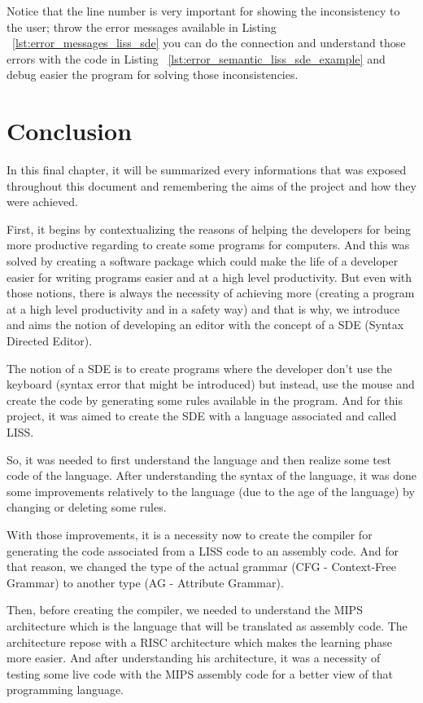\documentclass[
  oneside,
  11pt, a4paper,
  footinclude=true,
  headinclude=true,
  cleardoublepage=empty
]{scrbook}
\begin{document}
Notice that the line number is very important for showing the inconsistency to the user; throw the error messages available in Listing ~\ref{lst:error_messages_liss_sde} you can do the connection and understand those errors with the code in Listing ~\ref{lst:error_semantic_liss_sde_example} and debug easier the program for solving those inconsistencies.


\chapter{Conclusion}

In this final chapter, it will be summarized every informations that was exposed throughout this document and remembering the aims of the project and how they were achieved.

First, it begins by contextualizing the reasons of helping the developers for being more productive regarding to create some programs for computers. And this was solved by creating a software package which could make the life of a developer easier for writing programs easier and at a high level productivity. 
But even with those notions, there is always the necessity of achieving more (creating a program at a high level productivity and in a safety way) and that is why, we introduce and aims the notion of developing an editor with the concept of a SDE (Syntax Directed Editor). 

The notion of a SDE is to create programs where the developer don't use the keyboard (syntax error that might be introduced) but instead, use the mouse and create the code by generating some rules available in the program.
And for this project, it was aimed to create the SDE with a language associated and called LISS.

So, it was needed to first understand the language and then realize some test code of the language.
After understanding the syntax of the language, it was done some improvements relatively to the language (due to the age of the language) by changing or deleting some rules.

With those improvements, it is a necessity now to create the compiler for generating the code associated from a LISS code to an assembly code. And for that reason, we changed the type of the actual grammar (CFG - Context-Free Grammar) to another type (AG - Attribute Grammar).

Then, before creating the compiler, we needed to understand the MIPS architecture which is the language that will be translated as assembly code. The architecture repose with a RISC architecture which makes the learning phase more easier. And after understanding his architecture, it was a necessity of testing some live code with the MIPS assembly code for a better view of that programming language.
\end{document}
